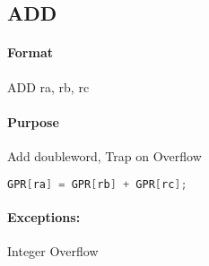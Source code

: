 \subsection{ADD}


\paragraph{Format} ADD ra, rb, rc

\paragraph{Purpose} Add doubleword, Trap on Overflow

\begin{lstlisting}[language=C]
    GPR[ra] = GPR[rb] + GPR[rc];
\end{lstlisting}

\paragraph{Exceptions:} Integer Overflow
